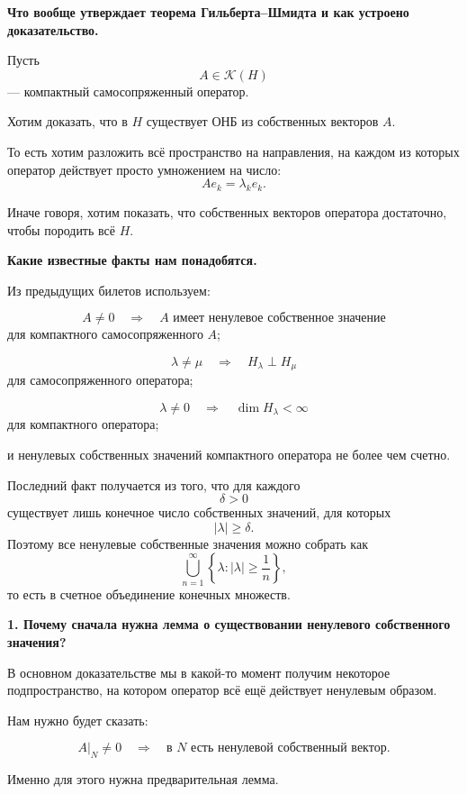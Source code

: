 \begin{idea}
	\textbf{Что вообще утверждает теорема Гильберта--Шмидта и как устроено доказательство.}
	
	Пусть
	\[
	A\in\mathcal K(H)
	\]
	--- компактный самосопряженный оператор.
	
	Хотим доказать, что в \(H\) существует ОНБ из собственных векторов \(A\).
	
	То есть хотим разложить всё пространство на направления, на каждом из которых
	оператор действует просто умножением на число:
	\[
	Ae_k=\lambda_k e_k.
	\]
	
	Иначе говоря, хотим показать, что собственных векторов оператора достаточно,
	чтобы породить всё \(H\).
	
	\medskip
	
	\textbf{Какие известные факты нам понадобятся.}
	
	Из предыдущих билетов используем:
	
	\[
	\boxed{
		A\neq0
		\quad\Longrightarrow\quad
		A\text{ имеет ненулевое собственное значение}
	}
	\]
	для компактного самосопряженного \(A\);
	
	\[
	\boxed{
		\lambda\neq\mu
		\quad\Longrightarrow\quad
		H_\lambda\perp H_\mu
	}
	\]
	для самосопряженного оператора;
	
	\[
	\boxed{
		\lambda\neq0
		\quad\Longrightarrow\quad
		\dim H_\lambda<\infty
	}
	\]
	для компактного оператора;
	
	и ненулевых собственных значений компактного оператора
	не более чем счетно.
	
	Последний факт получается из того, что для каждого
	\[
	\delta>0
	\]
	существует лишь конечное число собственных значений, для которых
	\[
	|\lambda|\geq\delta.
	\]
	Поэтому все ненулевые собственные значения можно собрать как
	\[
	\bigcup_{n=1}^{\infty}
	\left\{
	\lambda:
	|\lambda|\geq\frac1n
	\right\},
	\]
	то есть в счетное объединение конечных множеств.
	
	\medskip
	
	\textbf{1. Почему сначала нужна лемма о существовании ненулевого собственного значения?}
	
	В основном доказательстве мы в какой-то момент получим некоторое
	подпространство, на котором оператор всё ещё действует ненулевым образом.
	
	Нам нужно будет сказать:
	
	\[
	A|_N\neq0
	\quad\Longrightarrow\quad
	\text{в }N\text{ есть ненулевой собственный вектор}.
	\]
	
	Именно для этого нужна предварительная лемма.
	

\end{idea}
